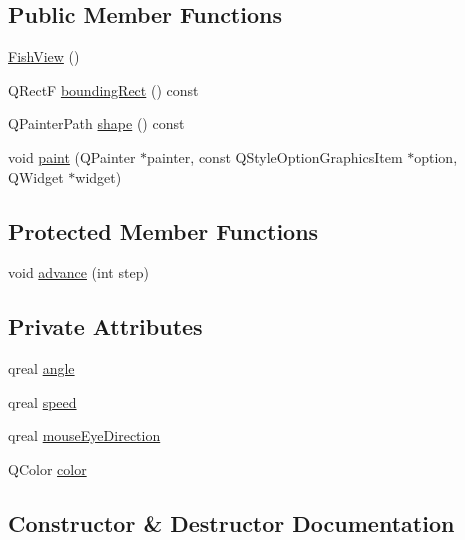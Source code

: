 \subsection*{Public Member Functions}
\begin{DoxyCompactItemize}
\item 
\hyperlink{classFishView_a6837f68f0d8823803d4e0d9445b07851_a6837f68f0d8823803d4e0d9445b07851}{Fish\+View} ()
\item 
Q\+RectF \hyperlink{classFishView_a6f48c2edec8894fefbdf78a30dfaea6b_a6f48c2edec8894fefbdf78a30dfaea6b}{bounding\+Rect} () const
\item 
Q\+Painter\+Path \hyperlink{classFishView_a84eca7db1edb590324cdb995847c7c14_a84eca7db1edb590324cdb995847c7c14}{shape} () const
\item 
void \hyperlink{classFishView_a1b51f33fd2877a28393c3f2649979e80_a1b51f33fd2877a28393c3f2649979e80}{paint} (Q\+Painter $\ast$painter, const Q\+Style\+Option\+Graphics\+Item $\ast$option, Q\+Widget $\ast$widget)
\end{DoxyCompactItemize}
\subsection*{Protected Member Functions}
\begin{DoxyCompactItemize}
\item 
void \hyperlink{classFishView_aa036988238ee305e0d5f2c8d117af9ec_aa036988238ee305e0d5f2c8d117af9ec}{advance} (int step)
\end{DoxyCompactItemize}
\subsection*{Private Attributes}
\begin{DoxyCompactItemize}
\item 
qreal \hyperlink{classFishView_a5ec328c652ae36aef35d13c260dfebc0_a5ec328c652ae36aef35d13c260dfebc0}{angle}
\item 
qreal \hyperlink{classFishView_acfc7a8baa078875d77aad279a6a80d64_acfc7a8baa078875d77aad279a6a80d64}{speed}
\item 
qreal \hyperlink{classFishView_ad778ef7e064dbe30fb1963576a68d6c0_ad778ef7e064dbe30fb1963576a68d6c0}{mouse\+Eye\+Direction}
\item 
Q\+Color \hyperlink{classFishView_a236ec7d747c4f6165cdeddf4b2fd7e56_a236ec7d747c4f6165cdeddf4b2fd7e56}{color}
\end{DoxyCompactItemize}


\subsection{Constructor \& Destructor Documentation}
\mbox{\label{classFishView_a6837f68f0d8823803d4e0d9445b07851_a6837f68f0d8823803d4e0d9445b07851}} 
